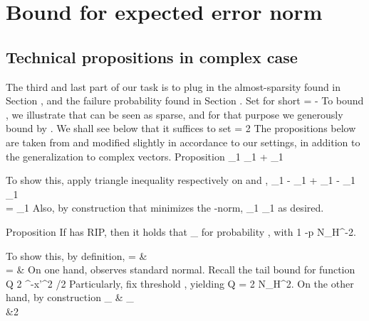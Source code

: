 \section {Bound for expected error norm}

\subsection {Technical propositions in complex case}

The third and last part of our task is to plug in the almost-sparsity found in Section , and the failure probability found in Section .
Set for short
%
 {
=  -  
}
%
To bound , we illustrate that  can be seen as sparse, and for that purpose we generously bound  by .
We shall see below that it suffices to set
%
 {
\g
= 2  
}
%
The propositions below are taken from \cite {CaT07} and modified slightly in accordance to our settings, in addition to the generalization to complex vectors.
%
\Result
{Proposition}
{
%
 {
 _1
\leq {} _1
+ _1 
}
}

To show this, apply triangle inequality respectively on  and ,
%
 {
 _1
-  _1
+  _1
-  _1
\leq {} _1 \notag \\
%
= _1 
}
%
Also, by construction that  minimizes the -norm,
%
 {
 _1
\leq {} _1 
}
as desired.

%
\Result
{Proposition}
{
If  has  RIP, then it holds that
%
 {
 _\infty
{}  
}
%
for probability , with
%
 {
1 -p
\leq N_H^{-2}. 
}
}

To show this, by definition,
%
 {
= & \notag \\
%
= & 
}
%
On one hand,  observes standard normal.
Recall the tail bound for  function
%
 {
Q
\leq {} {2} ^{-x'^2 /2} 
}
%
Particularly, fix threshold , yielding
%
 {
Q
= {2 N_H^2}. 
}
%
On the other hand, by construction
%
 {
 _\infty
\leq & _\infty \notag \\
%
\leq &2 
}

